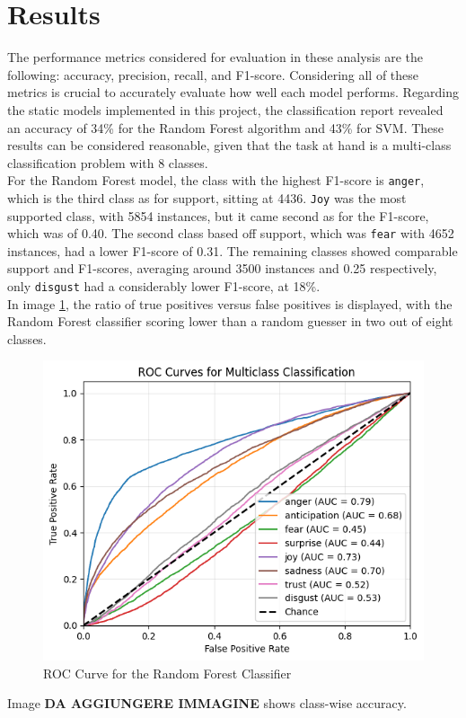 \chapter*{Results}
\label{ch:results}
The performance metrics considered for evaluation in these analysis are the
following: accuracy, precision, recall, and F1-score. Considering all of these
metrics is crucial to accurately evaluate how well each model performs.
Regarding the static models implemented in this project, the classification
report revealed an accuracy of 34\% for the Random Forest algorithm and 43\% for
SVM. These results can be considered reasonable, given that the task at hand
is a multi-class classification problem with 8 classes.\\

For the Random Forest model, the class with the highest F1-score is \texttt{anger},
which is the third class as for support, sitting at 4436. 
\texttt{Joy} was the most supported class, with 5854 instances, but it came second
as for the F1-score, which was of 0.40. The second class based off support, which
was \texttt{fear} with 4652 instances, had a lower F1-score of 0.31. 
The remaining classes showed comparable support and F1-scores, averaging around
3500 instances and 0.25 respectively, only \texttt{disgust} had a considerably
lower F1-score, at 18\%. \\
In image \ref{fig:roc_rf}, the ratio of true positives versus false positives is
displayed, with the Random Forest classifier scoring lower than a random guesser in
two out of eight classes. \\
\begin{figure}[H]
    \centering
    \includegraphics[width=0.7\linewidth]{pictures/roc_rf.png}
    \caption{ROC Curve for the Random Forest Classifier}
    \label{fig:roc_rf}
\end{figure}
Image \textbf{DA AGGIUNGERE IMMAGINE} shows class-wise accuracy. \\

